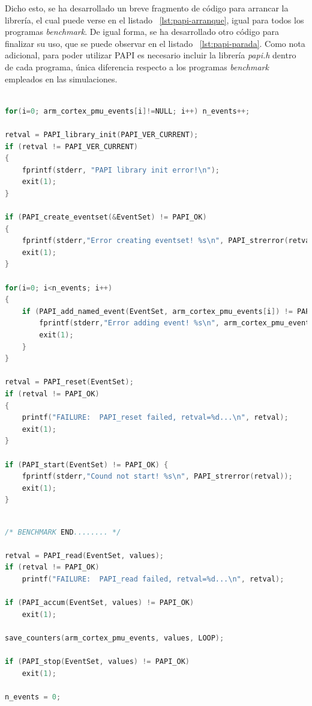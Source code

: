 Dicho esto, se ha desarrollado un breve fragmento de código para arrancar la librería, el cual puede verse en el listado ~\ref{lst:papi-arranque}, igual para todos los programas \textit{benchmark}. De igual forma, se ha desarrollado otro código para finalizar su uso, que se puede observar en el listado ~\ref{lst:papi-parada}. Como nota adicional, para poder utilizar PAPI es necesario incluir la librería \emph{papi.h} dentro de cada programa, única diferencia respecto a los programas \textit{benchmark} empleados en las simulaciones.

\begin{lstlisting}[language=C,frame=single,caption={Fragmento de código para arrancar PAPI},showstringspaces=false,label=lst:papi-arranque]

for(i=0; arm_cortex_pmu_events[i]!=NULL; i++) n_events++;

retval = PAPI_library_init(PAPI_VER_CURRENT);
if (retval != PAPI_VER_CURRENT) 
{
    fprintf(stderr, "PAPI library init error!\n");
    exit(1);
}

if (PAPI_create_eventset(&EventSet) != PAPI_OK)
{
    fprintf(stderr,"Error creating eventset! %s\n", PAPI_strerror(retval));
    exit(1);
}

for(i=0; i<n_events; i++)
{
    if (PAPI_add_named_event(EventSet, arm_cortex_pmu_events[i]) != PAPI_OK) {
        fprintf(stderr,"Error adding event! %s\n", arm_cortex_pmu_events[i]);
        exit(1);
    }
}

retval = PAPI_reset(EventSet);
if (retval != PAPI_OK)
{
    printf("FAILURE:  PAPI_reset failed, retval=%d...\n", retval);
    exit(1);
}

if (PAPI_start(EventSet) != PAPI_OK) {
    fprintf(stderr,"Cound not start! %s\n", PAPI_strerror(retval));
    exit(1);
}
\end{lstlisting}

\begin{lstlisting}[language=C,frame=single,showstringspaces=false,caption={Fragmento de código para parar PAPI},label=lst:papi-parada]

/* BENCHMARK END........ */

retval = PAPI_read(EventSet, values);
if (retval != PAPI_OK)
    printf("FAILURE:  PAPI_read failed, retval=%d...\n", retval);

if (PAPI_accum(EventSet, values) != PAPI_OK)
    exit(1);

save_counters(arm_cortex_pmu_events, values, LOOP);

if (PAPI_stop(EventSet, values) != PAPI_OK)
    exit(1);

n_events = 0;
\end{lstlisting}

